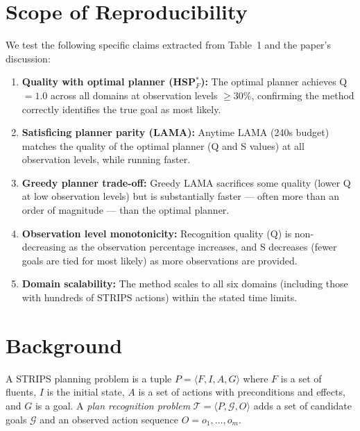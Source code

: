 \documentclass[10pt,twocolumn]{article}
\begin{document}
\section{Scope of Reproducibility}

We test the following specific claims extracted from Table~1 and the paper's discussion:

\begin{enumerate}[label=\textbf{H\arabic*.}, leftmargin=2.5em]
  \item \textbf{Quality with optimal planner (HSP$^*_F$):} The optimal planner achieves Q~$= 1.0$ across all domains at observation levels $\geq 30\%$, confirming the method correctly identifies the true goal as most likely.
  \item \textbf{Satisficing planner parity (LAMA):} Anytime LAMA (240s budget) matches the quality of the optimal planner (Q and S values) at all observation levels, while running faster.
  \item \textbf{Greedy planner trade-off:} Greedy LAMA sacrifices some quality (lower Q at low observation levels) but is substantially faster — often more than an order of magnitude — than the optimal planner.
  \item \textbf{Observation level monotonicity:} Recognition quality (Q) is non-decreasing as the observation percentage increases, and S decreases (fewer goals are tied for most likely) as more observations are provided.
  \item \textbf{Domain scalability:} The method scales to all six domains (including those with hundreds of STRIPS actions) within the stated time limits.
\end{enumerate}

\section{Background}

A STRIPS planning problem is a tuple $P = \langle F, I, A, G \rangle$ where $F$ is a set of fluents, $I$ is the initial state, $A$ is a set of actions with preconditions and effects, and $G$ is a goal. A \emph{plan recognition problem} $\mathcal{T} = \langle P, \mathcal{G}, O \rangle$ adds a set of candidate goals $\mathcal{G}$ and an observed action sequence $O = o_1, \ldots, o_m$.
\end{document}
